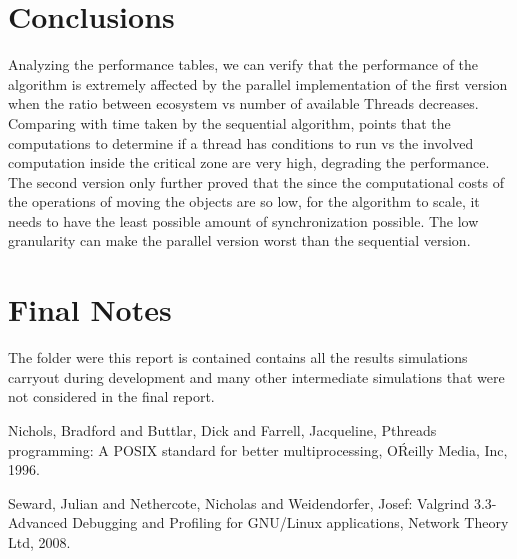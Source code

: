 \documentclass[10pt,a4paper,final]{report}
\begin{document}
\section{Conclusions}

Analyzing the performance tables, we can verify that the performance of the algorithm is extremely affected by the parallel implementation of the first version when the ratio between ecosystem vs number of available Threads decreases.
Comparing with time taken by the sequential algorithm, points that the computations to determine if a thread has conditions to run vs the involved computation inside the critical zone are very high, degrading the performance.
The second version only further proved that the since the computational costs of the operations of moving the objects are so low, for the algorithm to scale, it needs to have the least possible amount of synchronization possible. The low granularity can make the parallel version worst than the sequential version.


\section{Final Notes}
The folder were this report is contained contains all the results simulations carryout during development and many other intermediate simulations that were not considered in the final report.




\begin{thebibliography}{99}
 Nichols, Bradford and Buttlar, Dick and Farrell, Jacqueline, Pthreads programming: A POSIX standard for better multiprocessing, O\'Reilly Media, Inc, 1996.


 Seward, Julian and Nethercote, Nicholas and Weidendorfer, Josef: Valgrind 3.3-Advanced Debugging and Profiling for GNU/Linux applications, Network Theory Ltd, 2008.


\end{thebibliography}
  
\end{document}
